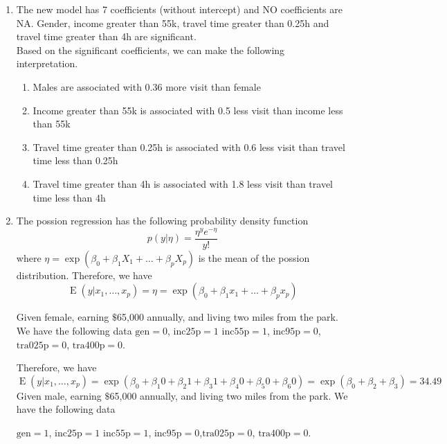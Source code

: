 \documentclass{article}
\DeclareMathOperator{\E}{E}
\begin{document}
\begin{enumerate}[label=(\alph*)]
\begin{enumerate}[label=(\arabic*)]
\begin{enumerate}[label=(\roman*)]
        \end{enumerate}
    \end{enumerate}

  \item
    The new model has 7 coefficients (without intercept) and NO coefficients are NA. Gender, income greater than 55k, travel time greater than 0.25h and travel time greater than 4h are significant. \\

    Based on the significant coefficients, we can make the following interpretation.

    \begin{enumerate}[label=(\roman*)]
      \item Males are associated with 0.36 more visit than female
      \item Income greater than 55k is associated with 0.5 less visit than income less than 55k
      \item Travel time greater than 0.25h is associated with 0.6 less visit than travel time less than 0.25h
      \item Travel time greater than 4h is associated with 1.8 less visit than travel time less than 4h

    \end{enumerate}

  \item
    The possion regression has the following probability density function
    \[
      p(y|\eta) = \frac{\eta^y e^{-\eta}}{y!}
    \]
    where $\eta = \exp(\beta_0 + \beta_1 X_1 + \ldots + \beta_p X_p)$ is the mean of the possion distribution. Therefore, we have
    \[
      \E(y|x_1, \ldots, x_p) = \eta = \exp(\beta_0 + \beta_1 x_1 + \ldots + \beta_p x_p)
    \]

    Given female, earning \(\$\)65,000 annually, and living two miles from the park. We have the following data
    \(\text{gen} = 0\), \(\text{inc25p} = 1\) \(\text{inc55p} = 1\), \(\text{inc95p} = 0\),\(\text{tra025p} = 0\), \(\text{tra400p} = 0\).

    Therefore, we have
    \[
      \E(y|x_1, \ldots, x_p) = \exp(\beta_0 + \beta_1 0 + \beta_2 1 + \beta_3 1 + \beta_4 0 + \beta_5 0 + \beta_6 0) = \exp(\beta_0 + \beta_2 + \beta_3) = 34.49
    \]
    Given male, earning \(\$\)65,000 annually, and living two miles from the park. We have the following data

    \(\text{gen} = 1\), \(\text{inc25p} = 1\) \(\text{inc55p} = 1\), \(\text{inc95p} = 0\),\(\text{tra025p} = 0\), \(\text{tra400p} = 0\).


\end{enumerate}
\end{document}
